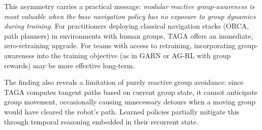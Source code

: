 This asymmetry carries a practical message: \textit{modular reactive group-awareness is most valuable when the base navigation policy has no exposure to group dynamics during training}. For practitioners deploying classical navigation stacks (ORCA, path planners) in environments with human groups, TAGA offers an immediate, zero-retraining upgrade. For teams with access to retraining, incorporating group-awareness into the training objective (as in GARN or AG-RL with group rewards) may be more effective long-term.

The finding also reveals a limitation of purely reactive group avoidance: since TAGA computes tangent paths based on current group state, it cannot anticipate group movement, occasionally causing unnecessary detours when a moving group would have cleared the robot's path. Learned policies partially mitigate this through temporal reasoning embedded in their recurrent state.
